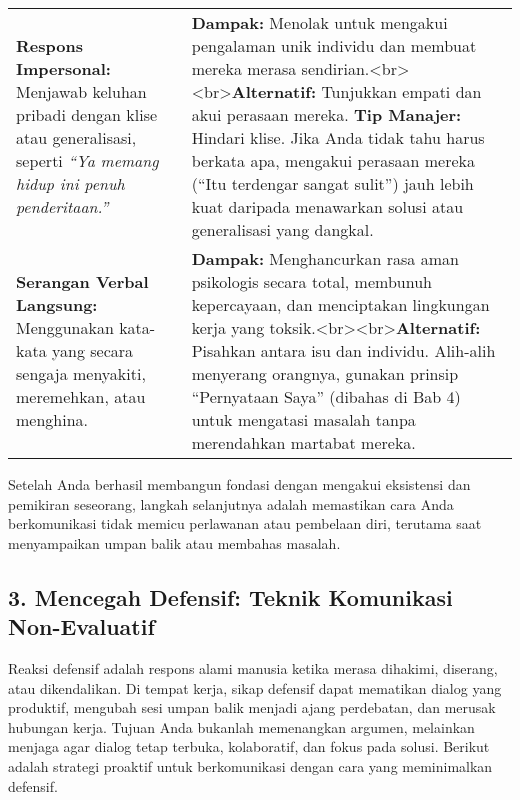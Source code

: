 \documentclass[
  letterpaper,
  DIV=11,
  numbers=noendperiod]{scrreprt}
\begin{document}
\begin{longtable}[]{@{}
  >{\raggedright\arraybackslash}p{}
  >{\raggedright\arraybackslash}p{}@{}}
\textbf{Respons Impersonal:} Menjawab keluhan pribadi dengan klise atau
generalisasi, seperti \emph{``Ya memang hidup ini penuh penderitaan.''}
& \textbf{Dampak:} Menolak untuk mengakui pengalaman unik individu dan
membuat mereka merasa
sendirian.\textless br\textgreater\textless br\textgreater{}\textbf{Alternatif:}
Tunjukkan empati dan akui perasaan mereka. \textbf{Tip Manajer:} Hindari
klise. Jika Anda tidak tahu harus berkata apa, mengakui perasaan mereka
(``Itu terdengar sangat sulit'') jauh lebih kuat daripada menawarkan
solusi atau generalisasi yang dangkal. \\
\textbf{Serangan Verbal Langsung:} Menggunakan kata-kata yang secara
sengaja menyakiti, meremehkan, atau menghina. & \textbf{Dampak:}
Menghancurkan rasa aman psikologis secara total, membunuh kepercayaan,
dan menciptakan lingkungan kerja yang
toksik.\textless br\textgreater\textless br\textgreater{}\textbf{Alternatif:}
Pisahkan antara isu dan individu. Alih-alih menyerang orangnya, gunakan
prinsip ``Pernyataan Saya'' (dibahas di Bab 4) untuk mengatasi masalah
tanpa merendahkan martabat mereka. \\
\end{longtable}

Setelah Anda berhasil membangun fondasi dengan mengakui eksistensi dan
pemikiran seseorang, langkah selanjutnya adalah memastikan cara Anda
berkomunikasi tidak memicu perlawanan atau pembelaan diri, terutama saat
menyampaikan umpan balik atau membahas masalah.

\subsection{3. Mencegah Defensif: Teknik Komunikasi
Non-Evaluatif}\label{mencegah-defensif-teknik-komunikasi-non-evaluatif}

Reaksi defensif adalah respons alami manusia ketika merasa dihakimi,
diserang, atau dikendalikan. Di tempat kerja, sikap defensif dapat
mematikan dialog yang produktif, mengubah sesi umpan balik menjadi ajang
perdebatan, dan merusak hubungan kerja. Tujuan Anda bukanlah memenangkan
argumen, melainkan menjaga agar dialog tetap terbuka, kolaboratif, dan
fokus pada solusi. Berikut adalah strategi proaktif untuk berkomunikasi
dengan cara yang meminimalkan defensif.
\end{document}
